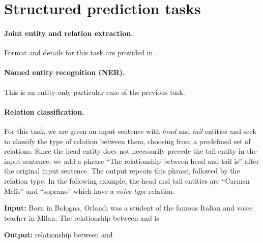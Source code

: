 \section{Structured prediction tasks} \label{sec:sp_tasks}

\paragraph{Joint entity and relation extraction.} 
Format and details for this task are provided in .

\paragraph{Named entity recognition (NER).}%
This is an entity-only particular case of the previous task. %

\paragraph{Relation classification.}
For this task, we are given an input sentence with \emph{head} and \emph{tail} entities 
and seek to classify the type of relation between them, choosing from a predefined set of relations. %
Since the head entity does not necessarily precede the tail entity in the input sentence, we add a phrase
``The relationship between \entitybegin head  \entityend and \entitybegin tail  \entityend is'' after the original input sentence. 
The output repeats this phrase, followed by the relation type. In the following example, the head and tail entities are ``Carmen Melis'' and ``soprano'' which have a \emph{voice type} relation.

\begin{footnotesize}
\begin{customquote}
\quotespacestart
    \textbf{Input:}
    \nohyphens{
    Born in Bologna, Orlandi was a student of the famous Italian \entitybegin {} \entityend and voice teacher \entitybegin {} \entityend in Milan.
    The relationship between \entitybegin {} \entityend and \entitybegin {} \entityend is}
    
    \textbf{Output:}
    relationship between \entitybegin {} \entityend and \entitybegin {} \entityend \equals {}
\quotespaceend
\end{customquote}
\end{footnotesize}

